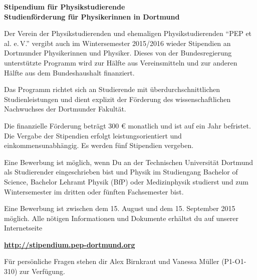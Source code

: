 \documentclass[
  paper=a4,
  fontsize=12pt,
  DIV=16,
  headheight=52pt,
  footheight=45pt,
  headinclude,
  parskip=full,
]{scrartcl}
\date{31. Juli 2014}
\begin{document}
\textbf{\Huge\sffamily Stipendium für Physikstudierende}\\[0.5\baselineskip]
\textbf{\Large\sffamily Studienförderung für  Physikerinnen in Dortmund}

{\large Der Verein der Physikstudierenden und ehemaligen Physikstudierenden \enquote{PEP et al. e.\,V.}
vergibt auch im Wintersemester 2015/2016 wieder Stipendien an Dortmunder Physikerinnen und Physiker.
Dieses von der Bundesregierung unterstützte Programm wird zur
Hälfte aus Vereinsmitteln und zur anderen Hälfte aus dem Bundeshaushalt finanziert.
}

Das Programm richtet sich an Studierende mit überdurchschnittlichen Studienleistungen und dient explizit der Förderung des wissenschaftlichen Nachwuchses der Dortmunder Fakultät.

Die finanzielle Förderung beträgt 300 € monatlich und ist auf ein Jahr befristet.
Die Vergabe der Stipendien erfolgt leistungsorientiert und einkommensunabhängig.
Es werden fünf Stipendien vergeben.

Eine Bewerbung ist möglich, wenn Du an der Technischen Universität Dortmund als Studierender eingeschrieben bist und Physik im Studiengang Bachelor of Science, Bachelor
Lehramt Physik (BfP) oder Medizinphysik studierst und zum Wintersemester im dritten
oder fünften Fachsemester bist.

Eine Bewerbung ist zwischen dem 15. August und dem 15. September 2015 möglich.
Alle nötigen Informationen und Dokumente erhältst du auf unserer Internetseite

\begin{center}
  \Huge\bfseries\url{http://stipendium.pep-dortmund.org}
\end{center}

Für persönliche Fragen stehen dir Alex Birnkraut und Vanessa Müller (P1-O1-310) zur
Verfügung.
\end{document}
